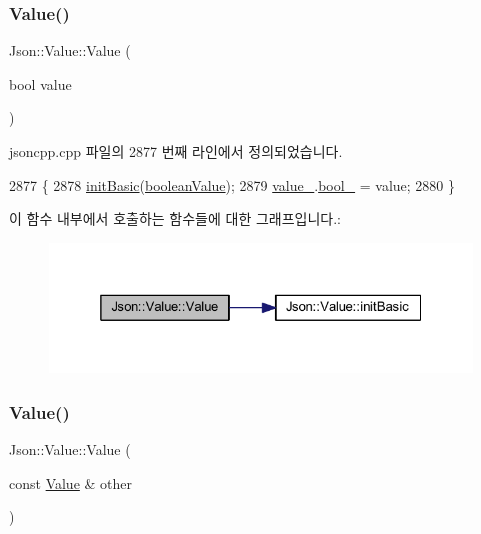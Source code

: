 \subsubsection{\texorpdfstring{Value()}{Value()}\hspace{0.1cm}{\footnotesize\ttfamily [11/12]}}
{\footnotesize\ttfamily Json\+::\+Value\+::\+Value (\begin{DoxyParamCaption}\item[{bool}]{value }\end{DoxyParamCaption})}



jsoncpp.\+cpp 파일의 2877 번째 라인에서 정의되었습니다.


\begin{DoxyCode}
2877                        \{
2878   \hyperlink{class_json_1_1_value_a32b86b71564157f40f880f5736be822a}{initBasic}(\hyperlink{namespace_json_a7d654b75c16a57007925868e38212b4ea14c30dbf4da86f7b809be299f671f7fd}{booleanValue});
2879   \hyperlink{class_json_1_1_value_aef578244546212705b9f81eb84d7e151}{value\_}.\hyperlink{union_json_1_1_value_1_1_value_holder_a92edab1861dadbfefd8be5fd4285eefe}{bool\_} = value;
2880 \}
\end{DoxyCode}
이 함수 내부에서 호출하는 함수들에 대한 그래프입니다.\+:\nopagebreak
\begin{figure}[H]
\begin{center}
\leavevmode
\includegraphics[width=325pt]{class_json_1_1_value_a350a31ea4a30d384994b0bc010b17495_cgraph}
\end{center}
\end{figure}
\mbox{\label{class_json_1_1_value_a436dfd3670f95fd665f680eba5cebcf0}} 
\subsubsection{\texorpdfstring{Value()}{Value()}\hspace{0.1cm}{\footnotesize\ttfamily [12/12]}}
{\footnotesize\ttfamily Json\+::\+Value\+::\+Value (\begin{DoxyParamCaption}\item[{const \hyperlink{class_json_1_1_value}{Value} \&}]{other }\end{DoxyParamCaption})}



